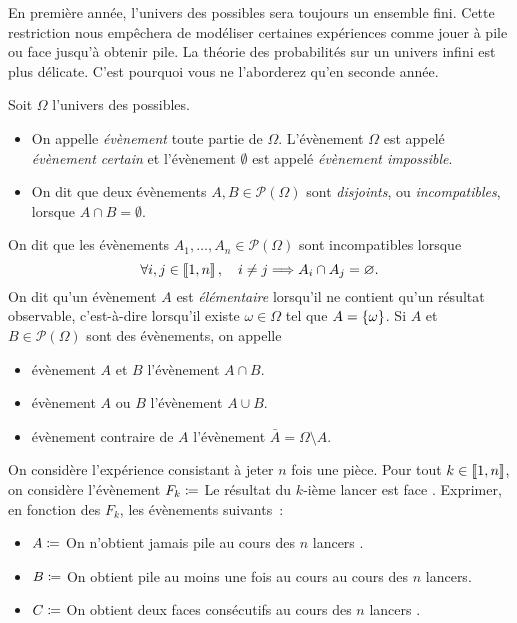 \documentclass{magnolia}
\begin{document}
\begin{remarqueUnique}
\remarque En première année, l'univers des possibles sera toujours un ensemble fini. Cette
  restriction nous empêchera de modéliser certaines expériences comme jouer à pile ou face
  jusqu'à obtenir pile. La théorie des probabilités sur un univers infini est
  plus délicate. C'est pourquoi vous ne l'aborderez qu'en seconde année.
\end{remarqueUnique}

\begin{definition}
Soit $\Omega$ l'univers des possibles.
\begin{itemize}
\item On appelle \emph{évènement} toute partie de $\Omega$. L'évènement $\Omega$ est appelé
  \emph{évènement certain} et l'évènement $\emptyset$ est appelé \emph{évènement impossible}.
\item On dit que deux évènements $A,B\in\mathcal{P}(\Omega)$ sont
  \emph{disjoints}, ou \emph{incompatibles}, lorsque
  $A\cap B=\emptyset$.
\end{itemize}
\end{definition}

\begin{remarques}
\remarque On dit que les évènements $A_1,\ldots,A_n\in\mathcal{P}(\Omega)$ sont incompatibles
  lorsque
  \[\forall i,j\in\left\llbracket 1,n\right\rrbracket,\quad i\neq j\Longrightarrow A_i\cap A_j=\varnothing.\]
\remarque On dit qu'un évènement $A$ est \emph{élémentaire} lorsqu'il ne contient qu'un résultat
  observable, c'est-à-dire lorsqu'il existe $\omega\in\Omega$ tel que $A=\left\{\omega\right\}$.
\remarque Si $A$ et $B\in\mathcal{P}(\Omega)$ sont des évènements, on appelle
  \begin{itemize}
  \item évènement \og $A$ et $B$ \fg l'évènement $A\cap B$.
  \item évènement \og $A$ ou $B$ \fg l'évènement $A\cup B$.
  \item évènement \og contraire de $A$ \fg l'évènement $\bar{A}=\Omega\setminus A$.
  \end{itemize}
\end{remarques}


\begin{exoUnique}
\exo On considère l'expérience consistant à jeter $n$ fois une pièce.
  Pour tout $k\in\left\llbracket 1,n\right\rrbracket$, on considère l'évènement
  $F_k\coloneqq$ \og Le résultat du $k$-ième lancer est face \fg. Exprimer, en fonction des $F_k$,
  les évènements suivants~:
  \begin{itemize}
  \item $A\coloneqq$ \og On n'obtient jamais pile au cours des $n$ lancers \fg.
  \item $B\coloneqq$ \og On obtient pile au moins une fois au cours au cours des $n$ lancers\fg.
  \item $C\coloneqq$ \og On obtient deux faces consécutifs au cours des $n$ lancers \fg.
  \end{itemize}

\end{exoUnique}
\end{document}
